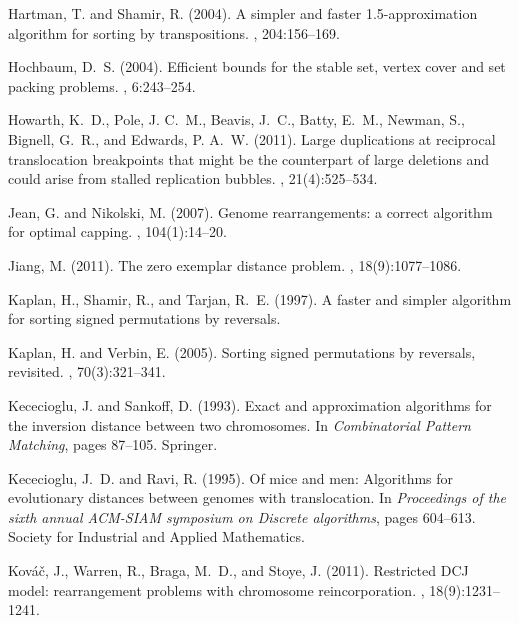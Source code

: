 \documentclass[11pt,final,twoside,nofrench]{thlifl}
\begin{document}
\begin{thebibliography}{}
Hartman, T. and Shamir, R. (2004).
\newblock A simpler and faster 1.5-approximation algorithm for sorting by
  transpositions.
, 204:156--169.

Hochbaum, D.~S. (2004).
\newblock Efficient bounds for the stable set, vertex cover and set packing
  problems.
, 6:243--254.

Howarth, K.~D., Pole, J. C.~M., Beavis, J.~C., Batty, E.~M., Newman, S.,
  Bignell, G.~R., and Edwards, P. A.~W. (2011).
\newblock Large duplications at reciprocal translocation breakpoints that might
  be the counterpart of large deletions and could arise from stalled
  replication bubbles.
, 21(4):525--534.

Jean, G. and Nikolski, M. (2007).
\newblock Genome rearrangements: a correct algorithm for optimal capping.
, 104(1):14--20.

Jiang, M. (2011).
\newblock The zero exemplar distance problem.
, 18(9):1077--1086.

Kaplan, H., Shamir, R., and Tarjan, R.~E. (1997).
\newblock A faster and simpler algorithm for sorting signed permutations by
  reversals.

Kaplan, H. and Verbin, E. (2005).
\newblock Sorting signed permutations by reversals, revisited.
, 70(3):321--341.

Kececioglu, J. and Sankoff, D. (1993).
\newblock Exact and approximation algorithms for the inversion distance between
  two chromosomes.
\newblock In {\em Combinatorial Pattern Matching}, pages 87--105. Springer.

Kececioglu, J.~D. and Ravi, R. (1995).
\newblock Of mice and men: Algorithms for evolutionary distances between
  genomes with translocation.
\newblock In {\em Proceedings of the sixth annual ACM-SIAM symposium on
  Discrete algorithms}, pages 604--613. Society for Industrial and Applied
  Mathematics.

Kováč, J., Warren, R., Braga, M.~D., and Stoye, J. (2011).
\newblock Restricted {DCJ} model: rearrangement problems with chromosome
  reincorporation.
, 18(9):1231--1241.


\end{thebibliography}
\end{document}
